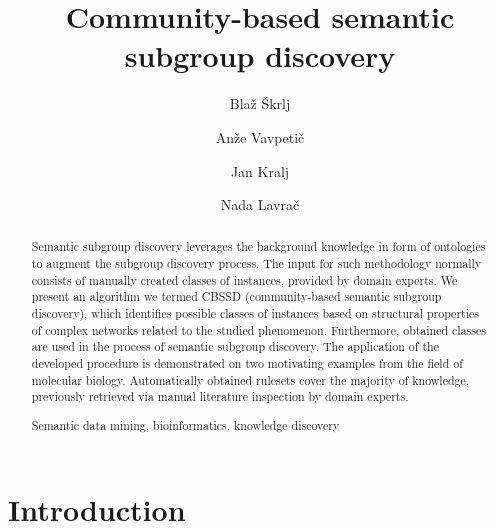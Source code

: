 \documentclass[oribibl,runningheads,a4paper]{llncs}
\newcommand{\keywords}[1]{\par\addvspace\baselineskip
\noindent\keywordname\enspace\ignorespaces#1}
\begin{document}
\mainmatter  %

\title{Community-based semantic subgroup discovery}


\author{Bla\v{z} \v{S}krlj%
\and An\v{z}e Vavpeti\v{c} \and Jan Kralj \and Nada Lavra\v{c}}
%



\maketitle


\begin{abstract}
Semantic subgroup discovery leverages the background knowledge in form of ontologies to augment the subgroup discovery process. The input for such methodology normally consists of manually created classes of instances, provided by domain experts. We present an algorithm we termed CBSSD (community-based semantic subgroup discovery), which identifies possible classes of instances based on structural properties of complex networks related to the studied phenomenon. Furthermore, obtained classes are used in the process of semantic subgroup discovery. The application of the developed procedure is demonstrated on two motivating examples from the field of molecular biology. Automatically obtained rulesets cover the majority of knowledge, previously retrieved via manual literature inspection by domain experts.
\keywords{Semantic data mining, bioinformatics, knowledge discovery}
\end{abstract}

\section{Introduction}
\end{document}
